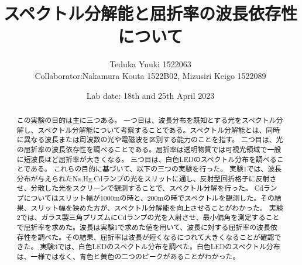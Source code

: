 \documentclass[a4paper,10pt]{jsarticle}
\begin{document}
\title{{ スペクトル分解能と屈折率の波長依存性について}}
\author{Teduka Yuuki 1522063 
\\
Collaborator:Nakamura Kouta 1522B02, Mizusiri Keigo 1522089 }
\date{Lab date: 18th and 25th April 2023}
\maketitle

\begin{abstract}
  この実験の目的は主に三つある。
  一つ目は、波長分布を既知とする光をスペクトル分解し、スペクトル分解能について考察することである。スペクトル分解能とは、同時に異なる波長または周波数の光や電磁波を区別する能力のことを指す。
  二つ目は、光の屈折率の波長依存性を調べることである。屈折率は透明物質では可視光領域で一般に短波長ほど屈折率が大きくなる。
  三つ目は、白色LEDのスペクトル分布を調べることである。
  これらの目的に基づいて、以下の三つの実験を行った。
  実験1では、波長分布が与えられたNa,Hg,Cdランプの光をスリットに通し、反射型回折格子に反射させ、分散した光をスクリーンで観測することで、スペクトル分解を行った。
  Cdランプについてはスリット幅が1000\textmu mの時と、200\textmu mの時でスペクトルを観測した。その結果、スリット幅を狭めた方が、スペクトル分解能を向上させることがわかった。
  実験2では、ガラス製三角プリズムにCdランプの光を入射させ、最小偏角を測定することで屈折率を求めた。波長は実験1で求めた値を用いて、波長に対する屈折率の波長依存性を調べた。その結果、屈折率は波長が短くなるにつれて大きくなることが確認できた。
  実験3では、白色LEDのスペクトル分布を調べた。白色LEDのスペクトル分布は、一様ではなく、青色と黄色の二つのピークがあることがわかった。
  
\end{abstract}
\end{document}
